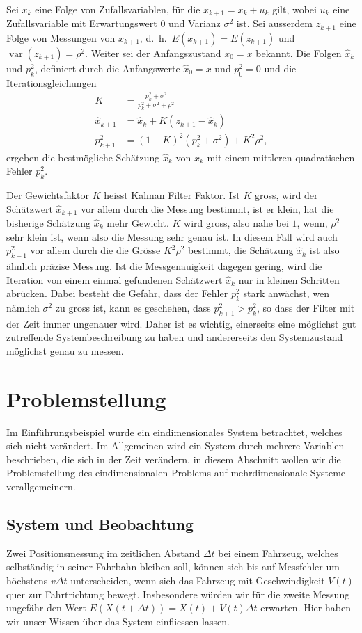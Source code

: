 \begin{satz}
Sei $x_k$ eine Folge von Zufallsvariablen, für die $x_{k+1}=x_k+u_k$ gilt, wobei
$u_k$ eine Zufallsvariable mit Erwartungswert $0$ und Varianz $\sigma^2$ ist.
Sei
ausserdem $z_{k+1}$ eine Folge von Messungen von $x_{k+1}$, d.~h.~$E(x_{k+1})=E(z_{k+1})$
und $\operatorname{var}(z_{k+1})=\rho^2$.
Weiter sei der Anfangszustand $x_0=x$ bekannt.
Die Folgen $\hat x_k$ und $p_k^2$, definiert durch die Anfangswerte
$\hat x_0=x$ und $p_0^2=0$ und die Iterationsgleichungen
\begin{align*}
K&=\frac{p_k^2+\sigma^2}{p_k^2+\sigma^2+\rho^2}\\
\hat x_{k+1}&=\hat x_k + K ( z_{k+1} - \hat x_k)\\
p_{k+1}^2&=(1-K)^2(p_k^2+\sigma^2)+K^2\rho^2,
\end{align*}
ergeben die bestmögliche Schätzung $\hat x_k$ von $x_k$ mit
einem mittleren quadratischen Fehler $p_k^2$.
\end{satz}
Der Gewichtsfaktor $K$ heisst Kalman Filter Faktor.
Ist $K$ gross, wird der
Schätzwert $\hat x_{k+1}$ vor allem durch die Messung bestimmt, ist er
klein, hat die bisherige Schätzung $\hat x_k$ mehr Gewicht.
$K$ wird gross,
also nahe bei $1$, wenn, $\rho^2$ sehr klein ist, wenn also die Messung
sehr genau ist.
In diesem Fall wird auch $p_{k+1}^2$ vor allem durch die
die Grösse $K^2\rho^2$ bestimmt, die Schätzung $\hat x_k$  ist also
ähnlich präzise Messung.
Ist die Messgenauigkeit dagegen gering,
wird die Iteration von einem einmal gefundenen Schätzwert $\hat x_k$
nur in kleinen Schritten abrücken.
Dabei besteht die Gefahr, dass
der Fehler $p_k^2$ stark anwächst, wen nämlich $\sigma^2$ zu gross
ist, kann es geschehen, dass $p_{k+1}^2>p_{k}^2$, so dass der Filter
mit der Zeit immer ungenauer wird.
Daher ist es wichtig, einerseits
eine möglichst gut zutreffende Systembeschreibung zu haben und andererseits
den Systemzustand möglichst genau zu messen.

\section{Problemstellung}
Im Einführungsbeispiel wurde ein eindimensionales System betrachtet,
welches sich nicht verändert.
Im Allgemeinen wird ein System durch
mehrere Variablen beschrieben, die sich in der Zeit verändern.
in diesem Abschnitt wollen wir die Problemstellung des eindimensionalen
Problems auf mehrdimensionale Systeme verallgemeinern.

\subsection{System und Beobachtung}
Zwei Positionsmessung im zeitlichen Abstand $\Delta t$
bei einem Fahrzeug, welches selbständig
in seiner Fahrbahn bleiben soll, können sich bis auf Messfehler um höchstens
$v\Delta t$ unterscheiden, wenn sich das Fahrzeug mit Geschwindigkeit $V(t)$
quer zur Fahrtrichtung bewegt.
Insbesondere würden wir für die zweite
Messung ungefähr den Wert $E(X(t+\Delta t)) = X(t) + V(t)\Delta t$
erwarten.
Hier haben wir unser Wissen über das System einfliessen lassen.

